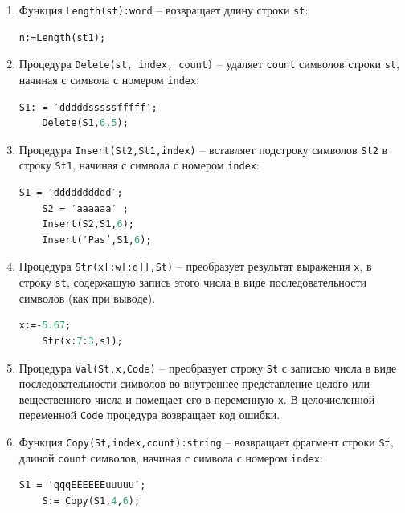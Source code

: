 \begin{enumerate}
\item Функция \texttt{Length(st):word} – возвращает длину строки \texttt{st}: 

\begin{lstlisting}[language=Pascal]
	n:=Length(st1);  
\end{lstlisting} 

\item Процедура \texttt{Delete(st, index, count)} – удаляет \texttt{count} символов строки \texttt{st}, начиная с символа с номером \texttt{index}:

\begin{lstlisting}[language=Pascal]
    S1: = ′dddddsssssfffff′; 
	Delete(S1,6,5);  
\end{lstlisting} 

\item Процедура \texttt{Insert(St2,St1,index)} – вставляет подстроку символов \texttt{St2} в строку \texttt{St1}, начиная с символа с номером \texttt{index}:

\begin{lstlisting}[language=Pascal]
	S1 = ′dddddddddd′;
	S2 = ′аааааа′ ;
	Insert(S2,S1,6);      
	Insert(′Pas’,S1,6);      
\end{lstlisting} 

\item Процедура \texttt{Str(x[:w[:d]],St)} – преобразует результат выражения \texttt{x}, в строку \texttt{st}, содержащую запись этого числа в виде последовательности символов (как при выводе). 

\begin{lstlisting}[language=Pascal]
	x:=-5.67;
	Str(x:7:3,s1);
\end{lstlisting} 

\item Процедура \texttt{Val(St,x,Code)} – преобразует строку \texttt{St} с записью числа в виде последовательности символов во внутреннее представление целого или вещественного числа и помещает его в переменную \texttt{x}.  В целочисленной переменной \texttt{Code} процедура возвращает код ошибки.

\item Функция \texttt{Copy(St,index,count):string} – возвращает фрагмент строки \texttt{St}, длиной \texttt{count} символов, начиная с символа с номером \texttt{index}:

\begin{lstlisting}[language=Pascal]
 	S1 = ′qqqEEEEEEuuuuu′;
 	S:= Copy(S1,4,6);     
\end{lstlisting} 


\end{enumerate}
